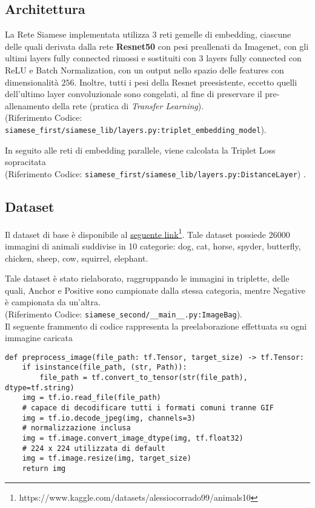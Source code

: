 \documentclass[twocolumn]{article}
\begin{document}
\subsection{Architettura}
La Rete Siamese implementata utilizza 3 reti gemelle di embedding, ciascune delle quali derivata dalla rete \textbf{Resnet50} con pesi preallenati da Imagenet, con gli ultimi layers fully connected rimossi
e sostituiti con 3 layers fully connected con ReLU e Batch Normalization, con un output nello spazio delle features con dimensionalit\`a $256$. Inoltre, tutti i pesi della Resnet preesistente, eccetto quelli
dell'ultimo layer convoluzionale sono congelati, al fine di preservare il pre-allenamento della rete (pratica di \textit{Transfer Learning}). \\
{\tiny (Riferimento Codice: \texttt{siamese\_first/siamese\_lib/layers.py:triplet\_embedding\_model})}.\par
In seguito alle reti di embedding parallele, viene calcolata la Triplet Loss sopracitata \\ {\tiny (Riferimento Codice: \texttt{siamese\_first/siamese\_lib/layers.py:DistanceLayer}) }.\par

\subsection{Dataset}
Il dataset di base \`e disponibile al \href{https://www.kaggle.com/datasets/alessiocorrado99/animals10}{seguente link}\footnote{https://www.kaggle.com/datasets/alessiocorrado99/animals10}. Tale dataset possiede
26000 immagini di animali suddivise in 10 categorie: dog, cat, horse, spyder, butterfly, chicken, sheep, cow, squirrel, elephant.\par
Tale dataset \`e stato rielaborato, raggruppando le immagini in triplette, delle quali, Anchor e Positive sono campionate dalla stessa categoria, mentre Negative \`e campionata da un'altra. \\
{\tiny (Riferimento Codice: \texttt{siamese\_second/\_\_main\_\_.py:ImageBag})}.\\
Il seguente frammento di codice rappresenta la preelaborazione effettuata su ogni immagine caricata
\begin{lstlisting}[style=mystyle, caption=Image Preprocessing]
def preprocess_image(file_path: tf.Tensor, target_size) -> tf.Tensor:
    if isinstance(file_path, (str, Path)):
        file_path = tf.convert_to_tensor(str(file_path), dtype=tf.string)
    img = tf.io.read_file(file_path)
    # capace di decodificare tutti i formati comuni tranne GIF
    img = tf.io.decode_jpeg(img, channels=3)
    # normalizzazione inclusa
    img = tf.image.convert_image_dtype(img, tf.float32)
    # 224 x 224 utilizzata di default
    img = tf.image.resize(img, target_size)
    return img
\end{lstlisting}
\end{document}

